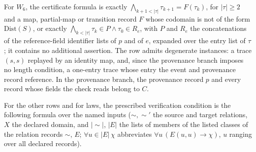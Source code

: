 For \(W_6\), the certificate formula is exactly \(\bigwedge_{k+1<|\tau|}\tau_{k+1}=F(\tau_k)\), for \(|\tau|\ge2\) and a map, partial-map or transition record \(F\) whose codomain is not of the form \(\mathrm{Dist}(S)\), or exactly \(\bigwedge_{k<|\tau|}\tau_k\in P\wedge\tau_0\in R_e\), with \(P\) and \(R_e\) the concatenations of the reference-field identifier lists of \(p\) and of \(e\), expanded over the entry list of \(\tau\); it contains no additional assertion. The row admits degenerate instances: a trace \((s,s)\)
replayed by an identity map, and, since the provenance branch imposes no
length condition, a one-entry trace whose entry the event and provenance record
reference. In the provenance branch, the provenance record \(p\) and every
record whose fields the check reads belong to \(C\).

For the other rows and for laws, the prescribed verification condition is the
following formula over the named inputs (\(\sim,\sim'\) the source and target
relations, \(X\) the declared domain, and \(|{\sim}|\), \(|E|\) the lists of
members of the listed classes of the relation records \(\sim\), \(E\); \(\forall u\in|E|\,\chi\) abbreviates \(\forall u\,(E(u,u)\to\chi)\), \(u\) ranging over all declared records).
